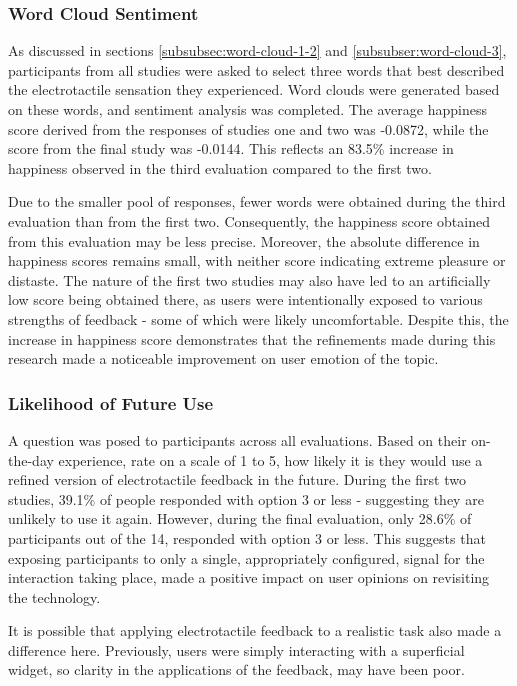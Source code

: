 \documentclass{mpaper}
\begin{document}
\subsubsection{Word Cloud Sentiment}
As discussed in sections \ref{subsubsec:word-cloud-1-2} and \ref{subsubser:word-cloud-3}, participants from all studies were asked to select three words that best described the electrotactile sensation they experienced. Word clouds were generated based on these words, and sentiment analysis was completed. The average happiness score derived from the responses of studies one and two was -0.0872, while the score from the final study was -0.0144. This reflects an 83.5\% increase in happiness observed in the third evaluation compared to the first two.

Due to the smaller pool of responses, fewer words were obtained during the third evaluation than from the first two. Consequently, the happiness score obtained from this evaluation may be less precise. Moreover, the absolute difference in happiness scores remains small, with neither score indicating extreme pleasure or distaste. The nature of the first two studies may also have led to an artificially low score being obtained there, as users were intentionally exposed to various strengths of feedback - some of which were likely uncomfortable. Despite this, the increase in happiness score demonstrates that the refinements made during this research made a noticeable improvement on user emotion of the topic. 

\subsubsection{Likelihood of Future Use}
A question was posed to participants across all evaluations. Based on their on-the-day experience, rate on a scale of 1 to 5, how likely it is they would use a refined version of electrotactile feedback in the future. During the first two studies, 39.1\% of people responded with option 3 or less - suggesting they are unlikely to use it again. However, during the final evaluation, only 28.6\% of participants out of the 14, responded with option 3 or less. This suggests that exposing participants to only a single, appropriately configured, signal for the interaction taking place, made a positive impact on user opinions on revisiting the technology. 

It is possible that applying electrotactile feedback to a realistic task also made a difference here. Previously, users were simply interacting with a superficial widget, so clarity in the applications of the feedback, may have been poor.
\end{document}
